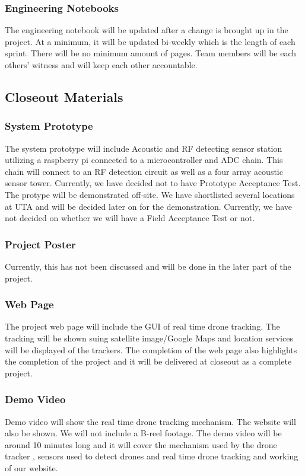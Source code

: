 \subsubsection{Engineering Notebooks}
The engineering notebook will be updated after a change is brought up in the project. At a minimum, it will be updated bi-weekly which is the length of each sprint. There will be no minimum amount of pages. Team members will be each others' witness and will keep each other accountable.

\subsection{Closeout Materials}
\subsubsection{System Prototype}
The system prototype will include Acoustic and RF detecting sensor station utilizing a raspberry pi connected to a microcontroller and ADC chain. This chain will connect to an RF detection circuit as well as a four array acoustic sensor tower. Currently, we have decided not to have Prototype Acceptance Test. The protype will be demonstrated off-site. We have shortlisted several locations at UTA and will be decided later on for the demonstration. Currently, we have not decided on whether we will have a Field Acceptance Test or not.

\subsubsection{Project Poster}
Currently, this has not been discussed and will be done in the later part of the project.

\subsubsection{Web Page}
The project web page will include the GUI of real time drone tracking. The tracking will be shown suing satellite image/Google Maps and location services will be displayed of the trackers. The completion of the web page also highlights the completion of the project and it will be delivered at closeout as a complete project.

\subsubsection{Demo Video}
Demo video will show the real time drone tracking mechanism. The website will also be shown. We will not include a B-reel footage. The demo video will be around 10 minutes long and it will cover the mechanism used by the drone tracker , sensors used to detect drones and real time drone tracking and working of our website.

